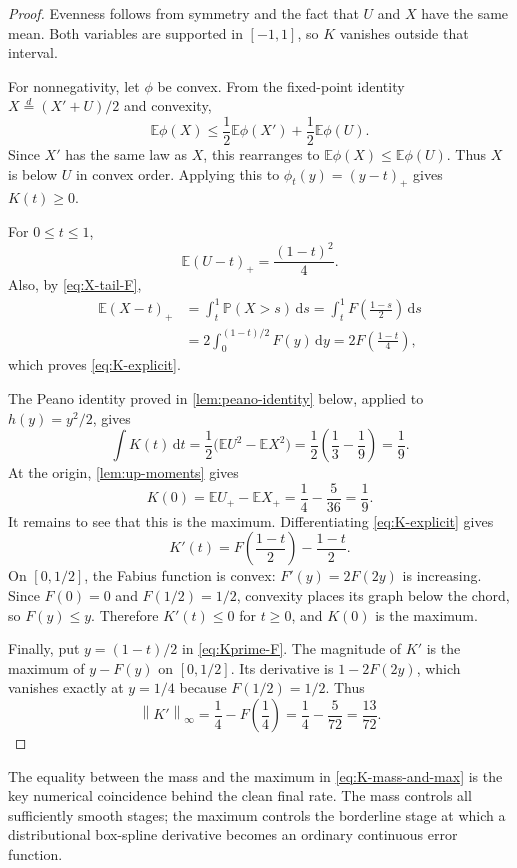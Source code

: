 \documentclass[11pt,oneside]{article}
\theoremstyle{definition}
\theoremstyle{remark}
\newcommand{\E}{\mathbb E}
\newcommand{\Prob}{\mathbb P}
\newcommand{\dd}{\,\mathrm d}
\newcommand{\norm}[1]{\left\lVert#1\right\rVert}
\newcommand{\pos}[1]{\left(#1\right)_{+}}
\begin{document}
\begin{proof}
Evenness follows from symmetry and the fact that $U$ and $X$ have the same mean.  Both
variables are supported in $[-1,1]$, so $K$ vanishes outside that interval.

For nonnegativity, let $\phi$ be convex.  From the fixed-point identity
$X\stackrel d=(X'+U)/2$ and convexity,
\[
 \E\phi(X)\le\frac12\E\phi(X')+\frac12\E\phi(U).
\]
Since $X'$ has the same law as $X$, this rearranges to
$\E\phi(X)\le\E\phi(U)$.  Thus $X$ is below $U$ in convex order.  Applying this to
$\phi_t(y)=\pos{y-t}$ gives $K(t)\ge0$.

For $0\le t\le1$,
\[
 \E\pos{U-t}=\frac{(1-t)^2}{4}.
\]
Also, by \eqref{eq:X-tail-F},
\begin{align*}
 \E\pos{X-t}
 &=\int_t^1\Prob(X>s)\dd s
 =\int_t^1F\left(\frac{1-s}{2}\right)\dd s\\
 &=2\int_0^{(1-t)/2}F(y)\dd y
 =2F\left(\frac{1-t}{4}\right),
\end{align*}
which proves \eqref{eq:K-explicit}.

The Peano identity proved in \cref{lem:peano-identity} below, applied to
$h(y)=y^2/2$, gives
\[
 \int K(t)\dd t=\frac12\bigl(\E U^2-\E X^2\bigr)
 =\frac12\left(\frac13-\frac19\right)=\frac19.
\]
At the origin, \cref{lem:up-moments} gives
\[
 K(0)=\E U_+-\E X_+=\frac14-\frac5{36}=\frac19.
\]
It remains to see that this is the maximum.  Differentiating
\eqref{eq:K-explicit} gives
\begin{equation}
 K'(t)=F\left(\frac{1-t}{2}\right)-\frac{1-t}{2}.
 \label{eq:Kprime-F}
\end{equation}
On $[0,1/2]$, the Fabius function is convex: $F'(y)=2F(2y)$ is increasing.  Since
$F(0)=0$ and $F(1/2)=1/2$, convexity places its graph below the chord, so
$F(y)\le y$.  Therefore $K'(t)\le0$ for $t\ge0$, and $K(0)$ is the maximum.

Finally, put $y=(1-t)/2$ in \eqref{eq:Kprime-F}.  The magnitude of $K'$ is the maximum of
$y-F(y)$ on $[0,1/2]$.  Its derivative is $1-2F(2y)$, which vanishes exactly at
$y=1/4$ because $F(1/2)=1/2$.  Thus
\[
 \norm{K'}_\infty=\frac14-F\left(\frac14\right)
 =\frac14-\frac5{72}=\frac{13}{72}.
\]
\end{proof}

The equality between the mass and the maximum in \eqref{eq:K-mass-and-max} is the key
numerical coincidence behind the clean final rate.  The mass controls all sufficiently
smooth stages; the maximum controls the borderline stage at which a distributional
box-spline derivative becomes an ordinary continuous error function.
\end{document}
